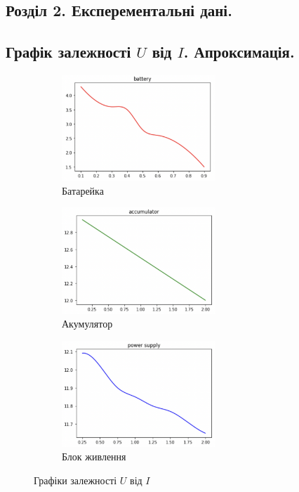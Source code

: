 \documentclass[a4paper,12pt]{article}
\begin{document}
\begin{justify}
	\section{Розділ 2. Експерементальні дані.}
	\subsection{Графік залежності $U$ від $I$. Апроксимація.}
	\begin{figure}[!h]
		\centering
		\begin{subfigure}{0.4\linewidth}
			\includegraphics[height=40mm]{media/graph5a.png}
    		\caption{Батарейка}
			\label{fig:5a}
    	\end{subfigure}\hfill
    	\begin{subfigure}{0.4\linewidth}
			\includegraphics[height=40mm]{media/graph5b.png}
    		\caption{Акумулятор}
			\label{fig:5b}
    	\end{subfigure}\hfill
    	\begin{subfigure}{0.4\linewidth}
			\includegraphics[height=40mm]{media/graph5c.png}
    		\caption{Блок живлення}
			\label{fig:5c}
    	\end{subfigure}\hfill
		\caption{Графіки залежності $U$ від $I$}
		\label{fig:5}
	\end{figure}

\end{justify}
\end{document}
